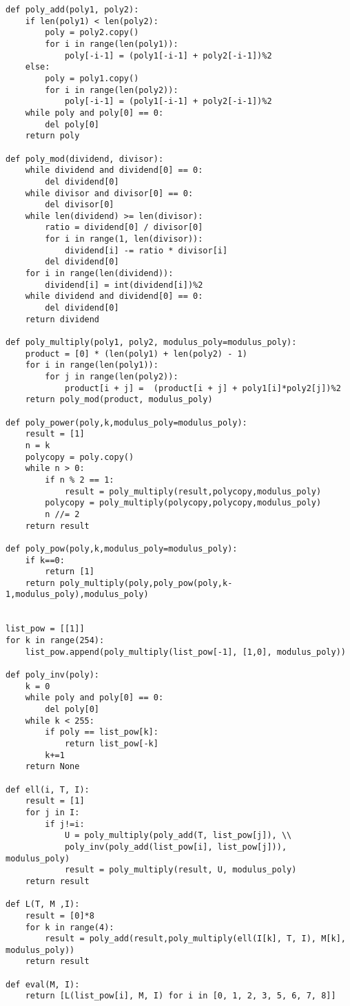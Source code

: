 \documentclass{article}
\begin{document}
\begin{lstlisting}
def poly_add(poly1, poly2):
    if len(poly1) < len(poly2):
        poly = poly2.copy()
        for i in range(len(poly1)):
            poly[-i-1] = (poly1[-i-1] + poly2[-i-1])%2
    else:
        poly = poly1.copy()
        for i in range(len(poly2)):
            poly[-i-1] = (poly1[-i-1] + poly2[-i-1])%2
    while poly and poly[0] == 0:
        del poly[0]
    return poly

def poly_mod(dividend, divisor):
    while dividend and dividend[0] == 0:
        del dividend[0]
    while divisor and divisor[0] == 0:
        del divisor[0]
    while len(dividend) >= len(divisor):
        ratio = dividend[0] / divisor[0]
        for i in range(1, len(divisor)):
            dividend[i] -= ratio * divisor[i]
        del dividend[0]
    for i in range(len(dividend)):
        dividend[i] = int(dividend[i])%2
    while dividend and dividend[0] == 0:
        del dividend[0]
    return dividend

def poly_multiply(poly1, poly2, modulus_poly=modulus_poly):
    product = [0] * (len(poly1) + len(poly2) - 1)
    for i in range(len(poly1)):
        for j in range(len(poly2)):
            product[i + j] =  (product[i + j] + poly1[i]*poly2[j])%2
    return poly_mod(product, modulus_poly)

def poly_power(poly,k,modulus_poly=modulus_poly):
    result = [1]
    n = k
    polycopy = poly.copy()
    while n > 0:
        if n % 2 == 1:
            result = poly_multiply(result,polycopy,modulus_poly)
        polycopy = poly_multiply(polycopy,polycopy,modulus_poly)
        n //= 2
    return result

def poly_pow(poly,k,modulus_poly=modulus_poly):
    if k==0:
        return [1]
    return poly_multiply(poly,poly_pow(poly,k-1,modulus_poly),modulus_poly)


list_pow = [[1]]
for k in range(254):
    list_pow.append(poly_multiply(list_pow[-1], [1,0], modulus_poly))

def poly_inv(poly):
    k = 0
    while poly and poly[0] == 0:
        del poly[0]
    while k < 255:
        if poly == list_pow[k]:
            return list_pow[-k]
        k+=1
    return None

def ell(i, T, I):
    result = [1]
    for j in I:
        if j!=i:
            U = poly_multiply(poly_add(T, list_pow[j]), \\
            poly_inv(poly_add(list_pow[i], list_pow[j])), modulus_poly)
            result = poly_multiply(result, U, modulus_poly)
    return result

def L(T, M ,I):
    result = [0]*8
    for k in range(4):
        result = poly_add(result,poly_multiply(ell(I[k], T, I), M[k], modulus_poly))
    return result

def eval(M, I):
    return [L(list_pow[i], M, I) for i in [0, 1, 2, 3, 5, 6, 7, 8]]
\end{lstlisting}
\end{document}
